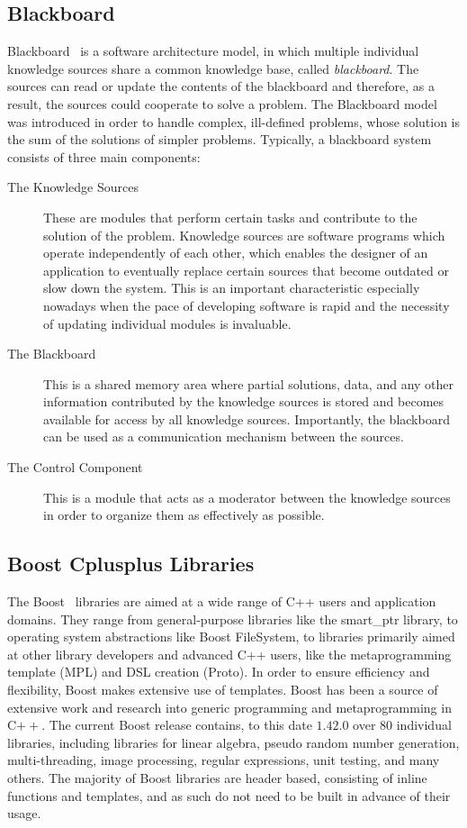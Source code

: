 \subsection{Blackboard}
\label{blackboard}
Blackboard~\cite{blackboard} is a software architecture model, in which multiple individual
knowledge sources share a common knowledge base, called {\em blackboard}. The sources can read or
update the contents of the blackboard and therefore, as a result, the sources could cooperate to solve a problem.
The Blackboard model was introduced in order to handle complex, ill-defined problems, whose solution
is the sum of the solutions of simpler problems. Typically, a blackboard system consists of three main components:
\begin{description}
 \item[The Knowledge Sources] These are modules that perform certain tasks and contribute to the solution
of the problem. Knowledge sources are software programs which operate independently of each
other, which enables the designer of an application to eventually replace certain sources that
become outdated or slow down the system. This is an important characteristic especially nowadays when the pace of
developing software is rapid and the necessity of updating individual modules is invaluable.
\item[The Blackboard] This is a shared memory area where partial solutions, data, and any other information contributed
by the knowledge sources is stored and becomes available for access by all knowledge sources.  Importantly, the
blackboard can be used as a communication mechanism between the sources.
\item[The Control Component] This is a module that acts as a moderator between the knowledge sources in order to
organize them as
effectively as possible.
\end{description}

\subsection{Boost Cplusplus Libraries}
The Boost~\cite{boost} libraries are aimed at a wide range of C++ users and application domains. They range from general-purpose libraries like the smart\_ptr  library, to operating system abstractions like Boost FileSystem, to libraries primarily aimed at other library developers and advanced C++ users, like the metaprogramming template (MPL) and DSL creation (Proto). In order to ensure efficiency and flexibility, Boost makes extensive use of templates. Boost has been a source of extensive work and research into generic programming and metaprogramming in C$++$. 
The current Boost release contains, to this date $1.42.0$ over 80 individual libraries, including libraries for linear algebra, pseudo random number generation, multi-threading, image processing, regular expressions, unit testing, and many others. The majority of Boost libraries are header based, consisting of inline functions and templates, and as such do not need to be built in advance of their usage.